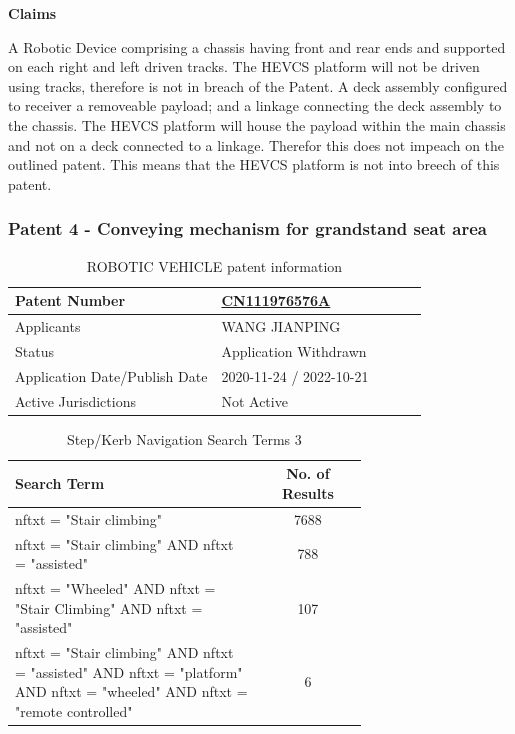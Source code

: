 \documentclass [12pt]{article}
\begin{document}
\textbf{Claims}

A Robotic Device comprising a chassis having front and rear ends and supported on each right and left driven tracks.
The HEVCS platform will not be driven using tracks, therefore is not in breach of the Patent.
A deck assembly configured to receiver a removeable payload; and a linkage connecting the deck assembly to the chassis.
The HEVCS platform will house the payload within the main chassis and not on a deck connected to a linkage. Therefor this does not impeach on the outlined patent.
This means that the HEVCS platform is not into breech of this patent.

\subsubsection{Patent 4 - Conveying mechanism for grandstand seat area}

\begin{table}[H]
    \centering
    \setlength{\arrayrulewidth}{1.5pt}
    \begin{tabular}{|p{0.5\linewidth}|p{0.5\linewidth}|}
    \hline
    Patent Number & \href{https://worldwide.espacenet.com/patent/search/family/044675803/publication/WO2011152890A2?q=WO2011152890A2}{CN111976576A}\\
    \hline
    Applicants & WANG JIANPING\\
    \hline
    Status & Application Withdrawn\\
    \hline
    Application Date/Publish Date & 2020-11-24 / 2022-10-21\\
    \hline
    Active Jurisdictions & Not Active\\
    \hline
    \end{tabular}
    \caption{ROBOTIC VEHICLE patent information}
    \label{table:robotic_vehicle_patent_information}
\end{table}

\begin{table}[H]
    \centering
    \setlength{\arrayrulewidth}{1.5pt}
    \begin{tabular}{|p{0.7\linewidth}|c|}
    \hline
    \cellcolor{gray!40}Search Term & \cellcolor{gray!40}No. of Results \\
    \hline
    nftxt = "Stair climbing" & 7688 \\
    \hline
    nftxt = "Stair climbing" AND nftxt = "assisted" & 788 \\
    \hline
    nftxt = "Wheeled" AND nftxt = "Stair Climbing" AND nftxt = "assisted" & 107 \\
    \hline
    nftxt = "Stair climbing" AND nftxt = "assisted" AND nftxt = "platform" AND nftxt = "wheeled" AND nftxt = "remote controlled"& 6 \\
    \hline
    \end{tabular}
    \caption{Step/Kerb Navigation Search Terms 3}
    \label{table:step_Kerb_nav_st_4}
\end{table}
\end{document}
